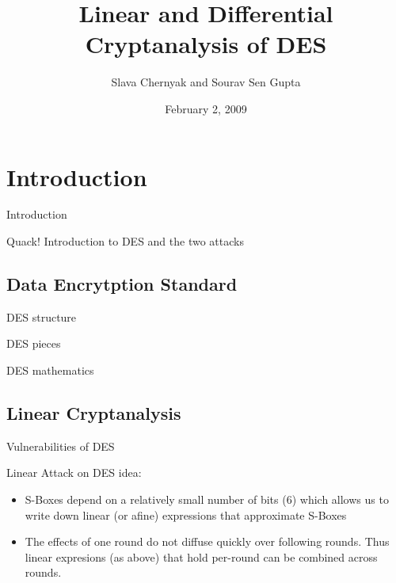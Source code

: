 \documentclass[9pt]{beamer}
\title{Linear and Differential Cryptanalysis of DES}
\author{Slava Chernyak and Sourav Sen Gupta}
\institute{University of Washington}
\date{February 2, 2009}
\begin{document}
\begin{frame}
\titlepage
\end{frame}

\section{Introduction}
\begin{frame}{Introduction}
\begin{block}{Quack!}
Introduction to DES and the two attacks
\end{block}
\end{frame}

\subsection{Data Encrytption Standard}
\begin{frame}
DES structure

\end{frame}

\begin{frame}
DES pieces

\end{frame}

\begin{frame}
DES mathematics

\end{frame}

\subsection{Linear Cryptanalysis}
\begin{frame}
Vulnerabilities of DES

\end{frame}

\begin{frame}
Linear Attack on DES idea:\\
\begin{itemize}
\item S-Boxes depend on a relatively small number of bits (6) which allows us to write down linear (or afine) expressions that approximate S-Boxes \\
\item The effects of one round do not diffuse quickly over following rounds. Thus linear expresions (as above) that hold per-round can be combined across rounds.
\end{itemize}
\end{frame}
\end{document}
